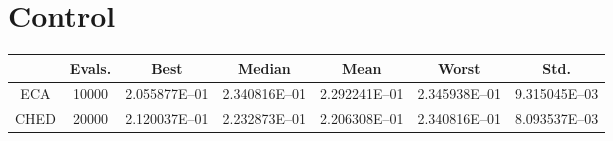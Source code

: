 \documentclass[12pt,letterpape]{article}
\begin{document}

\section{Control} %
\label{sec:control}


\begin{table}[!ht]
	\centering
	\begin{tabular}{ccccccc}
		\hline
		& {\bf Evals.} & {\bf Best} & {\bf Median} & {\bf Mean} & {\bf Worst} & {\bf Std.} \\ \hline
		ECA & 10000 & 2.055877E--01 & 2.340816E--01 & 2.292241E--01 & 2.345938E--01 & 9.315045E--03 \\ \hline
		CHED & 20000 & 2.120037E--01 & 2.232873E--01 & 2.206308E--01 & 2.340816E--01 & 8.093537E--03 \\ \hline
	\end{tabular}
\end{table}




\clearpage


\end{document}
